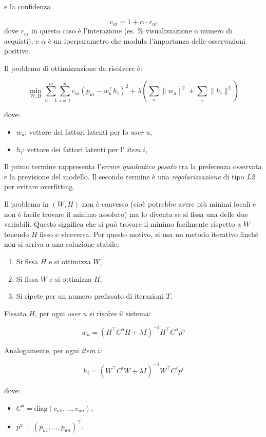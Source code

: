 e la confidenza
    
\[
c_{ui} = 1 + \alpha \cdot r_{ui}
\]
dove $r_{ui}$ in questo caso è l'interazione (es. \% visualizzazione o numero di acquisti), e $\alpha$ è un iperparametro che modula l'importanza delle osservazioni positive.

Il problema di ottimizzazione da risolvere è:

\[
\min_{W, H} \sum_{u=1}^m \sum_{i=1}^n c_{ui} (p_{ui} - w_u^\top h_i)^2 + \lambda \left( \sum_u \|w_u\|^2 + \sum_i \|h_i\|^2 \right)
\]

dove:

\begin{itemize}
    \item $w_u$: vettore dei fattori latenti per lo \textit{user} $u$,
    \item $h_i$: vettore dei fattori latenti per l' \textit{item} $i$,
\end{itemize}

Il primo termine rappresenta l'\textit{errore quadratico pesato} tra la preferenza osservata e la previsione del modello. Il secondo termine è una \textit{regolarizzazione} di tipo \textit{L2} per evitare overfitting.

Il problema in $(W,H)$ non è convesso (cioè potrebbe avere più minimi locali e non è facile trovare il minimo assoluto) ma lo diventa se si fissa una delle due variabili. Questo significa che si può trovare il minimo facilmente rispetto a $W$ tenendo $H$ fisso e viceversa. Per questo motivo, si usa un metodo iterativo finché non si arriva a una soluzione stabile:

\begin{enumerate}
    \item Si fissa $H$ e si ottimizza $W$,
    \item Si fissa $W$ e si ottimizza $H$,
    \item Si ripete per un numero prefissato di iterazioni $T$.
\end{enumerate}

Fissata $H$, per ogni \textit{user} $u$ si risolve il sistema:

\[
w_u = \left( H^\top C^u H + \lambda I \right)^{-1} H^\top C^u p^u
\]

Analogamente, per ogni \textit{item} $i$:

\[
h_i = \left( W^\top C^i W + \lambda I \right)^{-1} W^\top C^i p^i
\]

dove:

\begin{itemize}
    \item $C^u = \text{diag}(c_{u1}, \dots, c_{un})$,
    \item $p^u = (p_{u1}, \dots, p_{un})^\top$.
\end{itemize}

